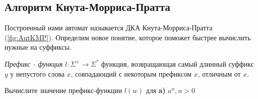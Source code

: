 \subsection{Алгоритм Кнута-Морриса-Пратта}
Построенный нами автомат называется ДКА Кнута-Морриса-Пратта (\ref{fig:AutKMP}). Определим новое понятие, которое поможет быстрее вычислить нужные на суффиксы.
\begin{Def}
\textit{Префикс - функция} $l: \Sigma^+ \rightarrow \Sigma^*$ функция, возвращающая самый длинный суффикс $y$ у непустого слова $x$, совпадающий с некоторым префиксом $x$, отличным от $x$.
\end{Def}

\begin{question}
Вычислите значение префикс-функции $l(w)$ для \textbf{a)} $a^n, n > 0$
\end{question}
